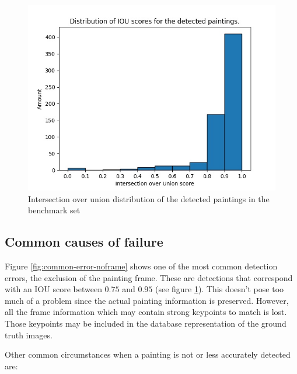 \begin{figure}[htbp]
    \includegraphics[width=\linewidth]{images/IOU_distribution.jpg}
    \caption{Intersection over union distribution of the detected paintings in the benchmark set}
    \label{fig:IOU-distribution}
\end{figure}



\subsection{Common causes of failure}
\label{subsec:detection-failure}

Figure \ref{fig:common-error-noframe} shows one of the most common detection errors, the exclusion of the painting frame. These are detections that correspond with an IOU score between $0.75$ and $0.95$ (see figure \ref{fig:IOU-distribution}). This doesn't pose too much of a problem since the actual painting information is preserved. However, all the frame information which may contain strong keypoints to match is lost. Those keypoints may be included in the database representation of the ground truth images.

Other common circumstances when a painting is not or less accurately detected are:

